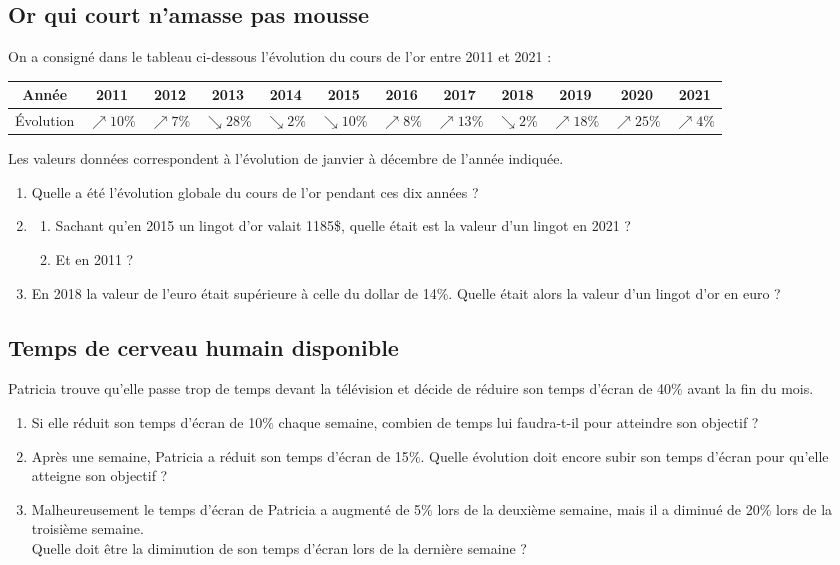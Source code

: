 \documentclass[oneside,12pt]{article}          %
\begin{document}
\subsection{Or qui court n'amasse pas mousse}
On a consigné dans le tableau ci-dessous l'évolution du cours de l'or entre 2011 et 2021 : 


\renewcommand{\arraystretch}{1.5}
{\small
\begin{tabular}{|c||c|c|c|c|c|c|c|c|c|c|c|}\hline 
     Année & 2011 & 2012 & 2013 & 2014 & 2015 & 2016 & 2017 & 2018 & 2019 & 2020 & 2021 \\ \hline
     Évolution & $\nearrow 10\%$ & $\nearrow 7\%$ & $\searrow 28\%$ & $\searrow 2\%$ & $\searrow 10\%$ & $\nearrow 8\%$ & $\nearrow 13\%$ & $\searrow 2\%$ & $\nearrow 18\%$ & $\nearrow 25\%$ & $\nearrow 4\%$ \\ \hline
\end{tabular}
}

Les valeurs données correspondent à l'évolution de janvier à décembre de l'année indiquée.
\begin{enumerate}
    \item Quelle a été l'évolution globale du cours de l'or pendant ces dix années ?
    \item \begin{enumerate}
        \item Sachant qu'en 2015 un lingot d'or valait 1185\$, quelle était est la valeur d'un lingot en 2021 ?
        \item Et en 2011 ?
    \end{enumerate}
    \item En 2018 la valeur de l'euro était supérieure à celle du dollar de 14\%. Quelle était alors la valeur d'un lingot d'or en euro ?
\end{enumerate}



\subsection{Temps de cerveau humain disponible}
Patricia trouve qu'elle passe trop de temps devant la télévision et décide de réduire son temps d'écran de 40$\%$ avant la fin du mois.
\begin{enumerate}
	\item Si elle réduit son temps d'écran de 10$\%$ chaque semaine, combien de temps lui faudra-t-il pour atteindre son objectif ?
	\item Après une semaine, Patricia a réduit son temps d'écran de 15$\%$. Quelle évolution doit encore subir son temps d'écran pour qu'elle atteigne son objectif ?
	\item Malheureusement le temps d'écran de Patricia a augmenté de 5$\%$ lors de la deuxième semaine, mais il a diminué de 20$\%$ lors de la troisième semaine.\\
	Quelle doit être la diminution de son temps d'écran lors de la dernière semaine ?
\end{enumerate}
\end{document}
